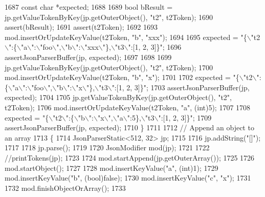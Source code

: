 \begin{DoxyCode}
{{{{{{{{{{{{{{{{{{{{{1687         \textcolor{keyword}{const} \textcolor{keywordtype}{char} *expected;
1688 
1689         \textcolor{keywordtype}{bool} bResult = jp.getValueTokenByKey(jp.getOuterObject(), \textcolor{stringliteral}{"t2"}, t2Token);
1690         assert(bResult);
1691         assert(t2Token);
1692 
1693         mod.insertOrUpdateKeyValue(t2Token, \textcolor{stringliteral}{"b"}, \textcolor{stringliteral}{"xxx"});
1694 
1695         expected = \textcolor{stringliteral}{"\{\(\backslash\)"t2\(\backslash\)":\{\(\backslash\)"a\(\backslash\)":\(\backslash\)"foo\(\backslash\)",\(\backslash\)"b\(\backslash\)":\(\backslash\)"xxx\(\backslash\)"\},\(\backslash\)"t3\(\backslash\)":[1, 2, 3]\}"};
1696         assertJsonParserBuffer(jp, expected);
1697 
1698 
1699         jp.getValueTokenByKey(jp.getOuterObject(), \textcolor{stringliteral}{"t2"}, t2Token);
1700         mod.insertOrUpdateKeyValue(t2Token, \textcolor{stringliteral}{"b"}, \textcolor{stringliteral}{"x"});
1701 
1702         expected = \textcolor{stringliteral}{"\{\(\backslash\)"t2\(\backslash\)":\{\(\backslash\)"a\(\backslash\)":\(\backslash\)"foo\(\backslash\)",\(\backslash\)"b\(\backslash\)":\(\backslash\)"x\(\backslash\)"\},\(\backslash\)"t3\(\backslash\)":[1, 2, 3]\}"};
1703         assertJsonParserBuffer(jp, expected);
1704 
1705         jp.getValueTokenByKey(jp.getOuterObject(), \textcolor{stringliteral}{"t2"}, t2Token);
1706         mod.insertOrUpdateKeyValue(t2Token, \textcolor{stringliteral}{"a"}, (\textcolor{keywordtype}{int})5);
1707 
1708         expected = \textcolor{stringliteral}{"\{\(\backslash\)"t2\(\backslash\)":\{\(\backslash\)"b\(\backslash\)":\(\backslash\)"x\(\backslash\)",\(\backslash\)"a\(\backslash\)":5\},\(\backslash\)"t3\(\backslash\)":[1, 2, 3]\}"};
1709         assertJsonParserBuffer(jp, expected);
1710     \}
1711 
1712     \textcolor{comment}{// Append an object to an array}
1713     \{
1714         JsonParserStatic<512, 32> jp;
1715 
1716         jp.addString(\textcolor{stringliteral}{"[]"});
1717 
1718         jp.parse();
1719 
1720         JsonModifier mod(jp);
1721 
1722         \textcolor{comment}{//printTokens(jp);}
1723 
1724         mod.startAppend(jp.getOuterArray());
1725 
1726         mod.startObject();
1727 
1728         mod.insertKeyValue(\textcolor{stringliteral}{"a"}, (\textcolor{keywordtype}{int})1);
1729         mod.insertKeyValue(\textcolor{stringliteral}{"b"}, (\textcolor{keywordtype}{bool})\textcolor{keyword}{false});
1730         mod.insertKeyValue(\textcolor{stringliteral}{"c"}, \textcolor{stringliteral}{"x"});
1731 
1732         mod.finishObjectOrArray();
1733 
}}}}}}}}}}}}}}}}}}}}}
\end{DoxyCode}
